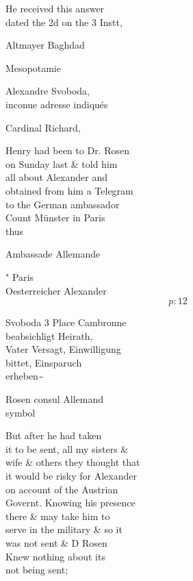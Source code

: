 \documentclass{report}
\begin{document}
	\par{
 	He received this answer\ \\dated the 2d on the 3 Instt,\ \\
	}

	\par{
 	Altmayer Baghdad\ \\
	}

	\par{
 	Mesopotamie\ \\
	}

	\par{
 	Alexandre Svoboda,\ \\inconue adresse indiqués\ \\
	}

	\par{
 	Cardinal Richard,\ \\
	}

	\par{
 	Henry had been to Dr. Rosen\ \\on Sunday last \& told him\ \\all about Alexander and\ \\obtained from him a Telegram\ \\to the German ambassador\ \\Count Münster in Paris\ \\thus\ \\
	}

	\par{
 	Ambassade Allemande\ \\
	}

	\par{
 	" Paris\ \\Oesterreicher Alexander\ \\
  \[p: 12 \]

	}

	\par{
 	Svoboda 3 Place Cambronne\ \\beabsichligt Heirath,\ \\Vater Versagt, Einwilligung\ \\bittet, Einsparuch\ \\erheben\~{}\ \\
	}

	\par{
 	Rosen consul Allemand\ \\ symbol\rbrack\ \\
	}

	\par{
 	But after he had taken\ \\it to be sent, all my sisters \&\ \\wife \& others they thought that\ \\it would be risky for Alexander\ \\on account of the Austrian\ \\Governt. Knowing his presence\ \\there \& may take him to\ \\serve in the military \& so it\ \\was not sent \& D Rosen\ \\Knew nothing about its\ \\not being sent;\ \\
	}
\end{document}
